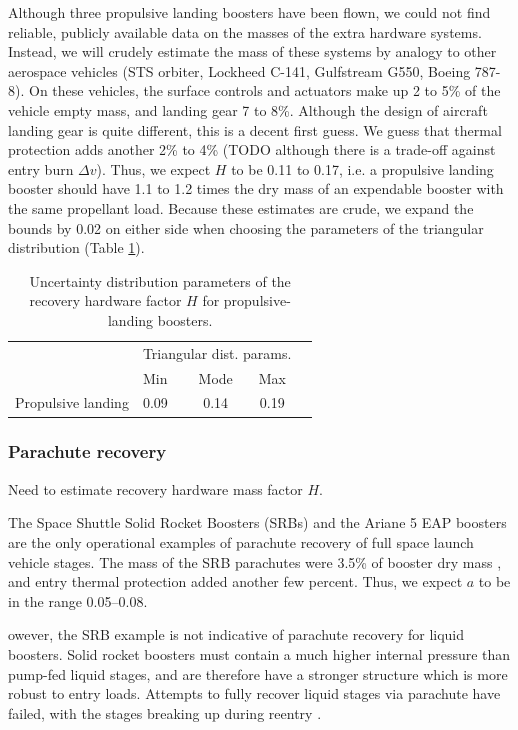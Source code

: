 \documentclass[conf]{../new-aiaa}
\begin{document}
Although three propulsive landing boosters have been flown, we could not find reliable, publicly available data on the masses of the extra hardware systems. Instead, we will crudely estimate the mass of these systems by analogy to other aerospace vehicles (STS orbiter, Lockheed C-141, Gulfstream G550, Boeing 787-8). On these vehicles, the surface controls and actuators make up 2 to 5\% of the vehicle empty mass, and landing gear 7 to 8\%. Although the design of aircraft landing gear is quite different, this is a decent first guess. We guess that thermal protection adds another 2\% to 4\% (TODO although there is a trade-off against entry burn $\Delta v$). Thus, we expect $H$ to be 0.11 to 0.17, i.e. a propulsive landing booster should have 1.1 to 1.2 times the dry mass of an expendable booster with the same propellant load. Because these estimates are crude, we expand the bounds by 0.02 on either side when choosing the parameters of the triangular distribution (Table \ref{tab:propulsive_pref_factor_distributions}).

\begin{table}[hbt!]
    \centering
    \caption{\label{tab:propulsive_pref_factor_distributions} Uncertainty distribution parameters of the recovery hardware factor $H$ for propulsive-landing boosters.}
    \begin{tabular}{l l c c c}
    \hline
     & \multicolumn{3}{c}{Triangular dist. params.} \\
     & Min & Mode & Max \\
    \hline
    \hline
    Propulsive landing  & 0.09 & 0.14 & 0.19 \\
    \hline
    \end{tabular}
\end{table}


\subsubsection{Parachute recovery}
Need to estimate recovery hardware mass factor $H$.

The Space Shuttle Solid Rocket Boosters (SRBs) and the Ariane 5 EAP boosters are the only operational examples of parachute recovery of full space launch vehicle stages. The mass of the SRB parachutes were 3.5\% of booster dry mass \cite{Wolf1996}, and entry thermal protection added another few percent. Thus, we expect $a$ to be in the range \SIrange{0.05}{0.08}{}.

owever, the SRB example is not indicative of parachute recovery for liquid boosters. Solid rocket boosters must contain a much higher internal pressure than pump-fed liquid stages, and are therefore have a stronger structure which is more robust to entry loads. Attempts to fully recover liquid stages via parachute have failed, with the stages breaking up during reentry \cite{Spencer2011}.
\end{document}
